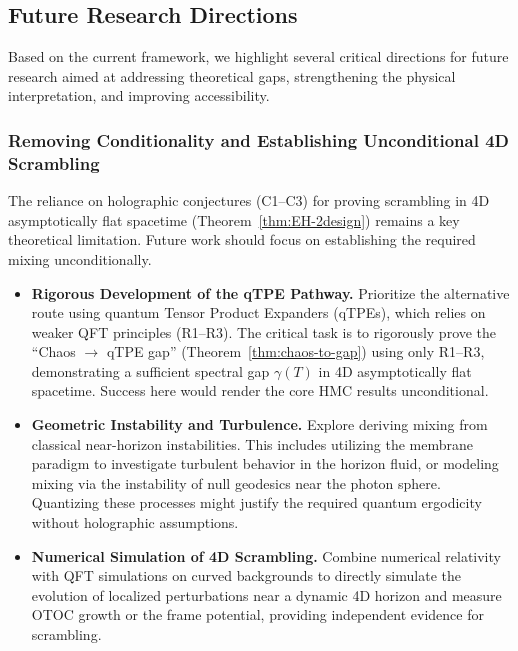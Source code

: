 \documentclass[aps,prd,preprint,onecolumn,superscriptaddress,nofootinbib,longbibliography,floatfix,11pt,showpacs,showkeys]{revtex4-2}
\theoremstyle{plain}
\theoremstyle{definition}
\theoremstyle{remark}
\begin{document}




\subsection{Future Research Directions}
\label{sec:future}
Based on the current framework, we highlight several critical directions for future research aimed at addressing theoretical gaps, strengthening the physical interpretation, and improving accessibility.

\subsubsection{Removing Conditionality and Establishing Unconditional 4D Scrambling}
The reliance on holographic conjectures (C1--C3) for proving scrambling in 4D asymptotically flat spacetime (Theorem~\ref{thm:EH-2design}) remains a key theoretical limitation. Future work should focus on establishing the required mixing unconditionally.
\begin{itemize}
    \item \textbf{Rigorous Development of the qTPE Pathway.} Prioritize the alternative route using quantum Tensor Product Expanders (qTPEs), which relies on weaker QFT principles (R1--R3). The critical task is to rigorously prove the ``Chaos $\to$ qTPE gap'' (Theorem~\ref{thm:chaos-to-gap}) using only R1--R3, demonstrating a sufficient spectral gap $\gamma(T)$ in 4D asymptotically flat spacetime. Success here would render the core HMC results unconditional.
    \item \textbf{Geometric Instability and Turbulence.} Explore deriving mixing from classical near-horizon instabilities. This includes utilizing the membrane paradigm to investigate turbulent behavior in the horizon fluid, or modeling mixing via the instability of null geodesics near the photon sphere. Quantizing these processes might justify the required quantum ergodicity without holographic assumptions.
    \item \textbf{Numerical Simulation of 4D Scrambling.} Combine numerical relativity with QFT simulations on curved backgrounds to directly simulate the evolution of localized perturbations near a dynamic 4D horizon and measure OTOC growth or the frame potential, providing independent evidence for scrambling.
\end{itemize}
\end{document}
